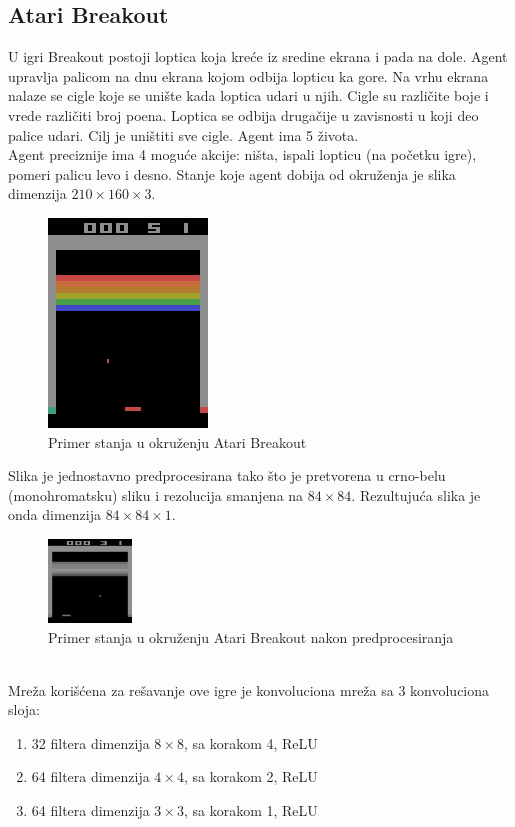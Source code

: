 \documentclass[a4paper,fleqn,12pt]{JMThesis}
\theoremstyle{plain}
\theoremstyle{definition}
\theoremstyle{definition}
\begin{document}
\subsection{Atari Breakout}
U igri Breakout postoji loptica koja kreće iz sredine ekrana i pada na dole. Agent upravlja palicom na dnu ekrana
kojom odbija lopticu ka gore. Na vrhu ekrana nalaze se cigle koje se unište kada loptica udari u njih. Cigle
su različite boje i vrede različiti broj poena. Loptica se odbija drugačije u zavisnosti u koji deo palice udari.
Cilj je uništiti sve cigle. Agent ima 5 života.\\
Agent preciznije ima 4 moguće akcije: ništa, ispali lopticu (na početku igre), pomeri palicu levo i desno.
Stanje koje agent dobija od okruženja je slika dimenzija $210 \times 160 \times 3$.
\begin{figure}[!ht]
	\centering
	\includegraphics[scale=1]{../graph-visuals/breakout/breakout_sample.png}
	\caption{Primer stanja u okruženju Atari Breakout}
\end{figure}
Slika je jednostavno predprocesirana tako što je pretvorena u crno-belu (monohromatsku) sliku i 
rezolucija smanjena na $84 \times 84$. Rezultujuća slika je onda dimenzija $84 \times 84 \times 1$.
\begin{figure}[!ht]
	\centering
	\includegraphics[scale=2]{../graph-visuals/breakout/breakout_sample_preprocess.png}
	\caption{Primer stanja u okruženju Atari Breakout nakon predprocesiranja}
\end{figure}\\
Mreža korišćena za rešavanje ove igre je konvoluciona mreža sa 3 konvoluciona sloja:
\begin{enumerate}
	\item 32 filtera dimenzija $8 \times 8$, sa korakom 4, ReLU
 	\item 64 filtera dimenzija $4 \times 4$, sa korakom 2, ReLU
  	\item 64 filtera dimenzija $3 \times 3$, sa korakom 1, ReLU
\end{enumerate}
\end{document}
